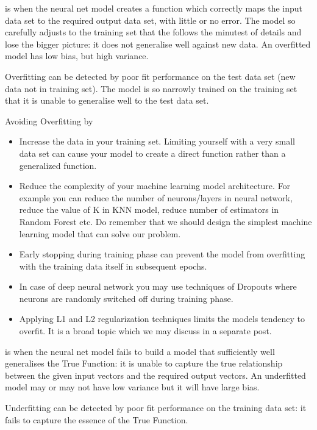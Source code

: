  is when  the neural net model creates a function which correctly maps  the input data set to the required output data set, with little or no error.  The model so carefully adjusts to the training set that the follows the minutest of details and lose the bigger picture: it does not generalise well against new data.  An overfitted model has low bias, but high variance.

Overfitting can be detected by poor fit performance on the test data set (new data not in training set).  The model is so narrowly trained on the training set that it is unable to generalise well to the test data set.

Avoiding Overfitting by 
\begin{itemize}
\item Increase the data in your training set. Limiting yourself with a very small data set can cause your model to create a direct function rather than a generalized function.
\item Reduce the complexity of your machine learning model architecture. For example you can reduce the number of neurons/layers in neural network, reduce the value of K in KNN model, reduce number of estimators in Random Forest etc. Do remember that we should design the simplest machine learning model that can solve our problem.
\item Early stopping during training phase can prevent the model from overfitting with the training data itself in subsequent epochs.
\item In case of deep neural network you may use techniques of Dropouts where neurons are randomly switched off during training phase.
\item Applying L1 and L2 regularization techniques limits the models tendency to overfit. It is a broad topic which we may discuss in a separate post.
\end{itemize}


 is when the neural net model fails to build a model that sufficiently well generalises the True Function:  it is unable to capture the true relationship between the given input vectors and the required output vectors.
An underfitted model may or may not have low variance but it will have large bias.  

Underfitting can be detected by poor fit performance on the training data set: it fails to capture the essence of the True Function.

